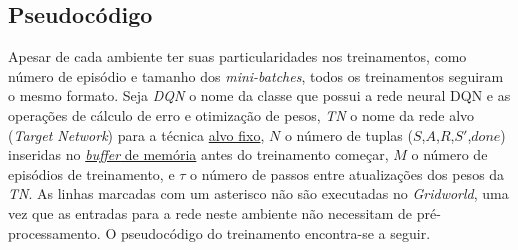 
%
%

\subsection{Pseudocódigo}
\label{sec:pseudocodigo}

Apesar de cada ambiente ter suas particularidades nos treinamentos, como número de episódio e tamanho dos \textit{mini-batches}, todos os treinamentos seguiram o mesmo formato.
Seja \textit{DQN} o nome da classe que possui a rede neural DQN e as operações de cálculo de erro e otimização de pesos, \textit{TN} o nome da rede alvo (\textit{Target Network}) para a técnica \hyperref[sec:ft]{alvo fixo}, $N$ o número de tuplas ($S$,$A$,$R$,$S'$,$done$) inseridas no \hyperref[sec:ep]{\textit{buffer} de memória} antes do treinamento começar, $M$ o número de episódios de treinamento, e $\tau$ o número de passos entre atualizações dos pesos da \textit{TN}.
As linhas marcadas com um asterisco não são executadas no \textit{Gridworld}, uma vez que as entradas para a rede neste ambiente não necessitam de pré-processamento.
O pseudocódigo do treinamento encontra-se a seguir.
\\

